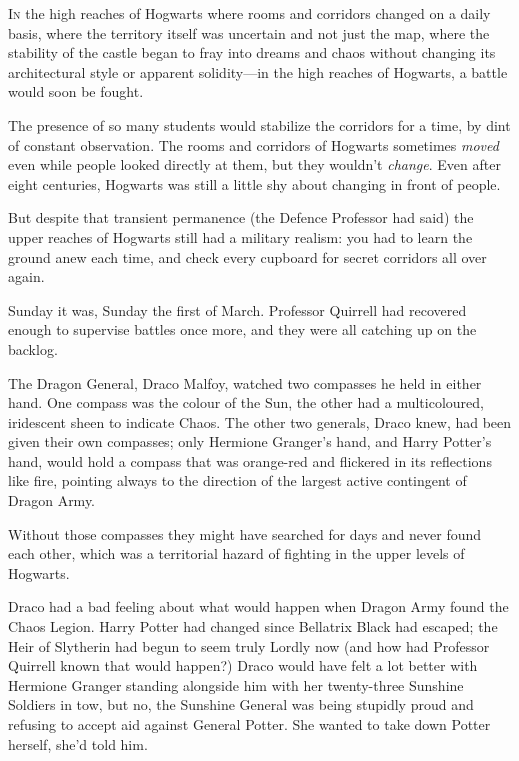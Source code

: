 
\lettrine{I}{n} the high reaches of Hogwarts where rooms and corridors changed on a daily basis, where the territory itself was uncertain and not just the map, where the stability of the castle began to fray into dreams and chaos without changing its architectural style or apparent solidity—in the high reaches of Hogwarts, a battle would soon be fought.

The presence of so many students would stabilize the corridors for a time, by dint of constant observation. The rooms and corridors of Hogwarts sometimes \emph{moved} even while people looked directly at them, but they wouldn't \emph{change}. Even after eight centuries, Hogwarts was still a little shy about changing in front of people.

But despite that transient permanence (the Defence Professor had said) the upper reaches of Hogwarts still had a military realism: you had to learn the ground anew each time, and check every cupboard for secret corridors all over again.

Sunday it was, Sunday the first of March. Professor Quirrell had recovered enough to supervise battles once more, and they were all catching up on the backlog.

The Dragon General, Draco Malfoy, watched two compasses he held in either hand. One compass was the colour of the Sun, the other had a multicoloured, iridescent sheen to indicate Chaos. The other two generals, Draco knew, had been given their own compasses; only Hermione Granger's hand, and Harry Potter's hand, would hold a compass that was orange-red and flickered in its reflections like fire, pointing always to the direction of the largest active contingent of Dragon Army.

Without those compasses they might have searched for days and never found each other, which was a territorial hazard of fighting in the upper levels of Hogwarts.

Draco had a bad feeling about what would happen when Dragon Army found the Chaos Legion. Harry Potter had changed since Bellatrix Black had escaped; the Heir of Slytherin had begun to seem truly Lordly now (and how had Professor Quirrell known that would happen?) Draco would have felt a lot better with Hermione Granger standing alongside him with her twenty-three Sunshine Soldiers in tow, but no, the Sunshine General was being stupidly proud and refusing to accept aid against General Potter. She wanted to take down Potter herself, she'd told him.

